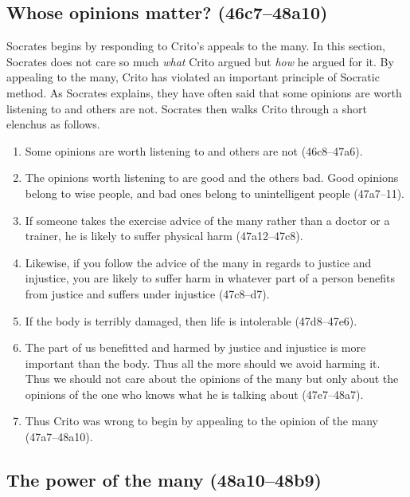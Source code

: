 \documentclass[11pt]{article}
\begin{document}

\subsection{Whose opinions matter? (46c7--48a10)}

Socrates begins by responding to Crito's appeals to the many.  In this section,
Socrates does not care so much \emph{what} Crito argued but \emph{how} he
argued for it.  By appealing to the many, Crito has violated an important
principle of Socratic method.  As Socrates explains, they have often said that
some opinions are worth listening to and others are not.  Socrates then walks
Crito through a short elenchus as follows.

\begin{enumerate}
    \item Some opinions are worth listening to and others are not (46c8--47a6).
    \item The opinions worth listening to are good and the others bad.  Good
        opinions belong to wise people, and bad ones belong to unintelligent
        people (47a7--11).
    \item If someone takes the exercise advice of the many rather than a doctor
        or a trainer, he is likely to suffer physical harm (47a12--47c8).
    \item Likewise, if you follow the advice of the many in regards to justice
        and injustice, you are likely to suffer harm in whatever part of
        a person benefits from justice and suffers under injustice (47c8--d7).
    \item If the body is terribly damaged, then life is intolerable
        (47d8--47e6).
    \item The part of us benefitted and harmed by justice and injustice is more
        important than the body.  Thus all the more should we avoid harming it.
        Thus we should not care about the opinions of the many but only about
        the opinions of the one who knows what he is talking about
        (47e7--48a7).
    \item Thus Crito was wrong to begin by appealing to the opinion of the many
        (47a7--48a10).
\end{enumerate}


\subsection{The power of the many (48a10--48b9)}
\end{document}
